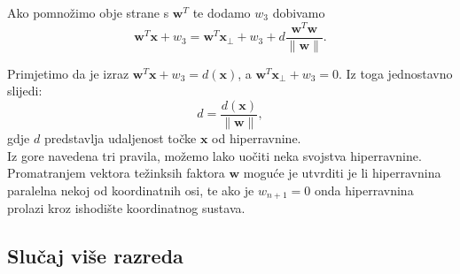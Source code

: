 \documentclass{book}
\begin{document}
Ako pomnožimo obje strane s $\mathbf{w}^T$ te dodamo $w_3$ dobivamo
$$\mathbf{w}^T\mathbf{x} + w_3 = \mathbf{w}^T\mathbf{x_{\perp}} + w_3
+ d\frac{\mathbf{w}^T\mathbf{w}}{\lVert \mathbf{w}
\rVert}. $$

Primjetimo da je izraz $\mathbf{w}^T\mathbf{x} + w_3 = d(\mathbf{x})$, a
$\mathbf{w}^T\mathbf{x_{\perp}} + w_3 = 0$. Iz toga jednostavno slijedi:
$$d = \frac{d(\mathbf{x})}{\lVert \mathbf{w} \rVert },$$
gdje $d$ predstavlja udaljenost točke $\mathbf{x}$ od hiperravnine. \\

Iz gore navedena tri pravila, možemo lako uočiti neka svojstva hiperravnine.
Promatranjem vektora težinksih faktora $\mathbf{w}$ moguće je utvrditi je li
hiperravnina paralelna nekoj od koordinatnih osi, te ako je $w_{n+1}=0$ onda
hiperravnina prolazi kroz ishodište koordinatnog sustava.



\subsection{Slučaj više razreda}
\end{document}
